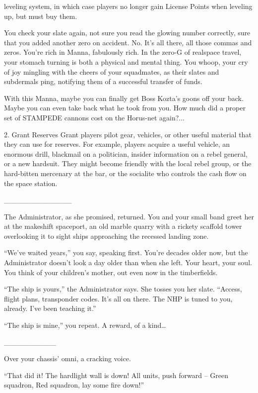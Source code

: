 leveling system, in which case players no longer gain License Points when leveling up, but must
buy them.


You check your slate again, not sure you read the glowing number correctly, sure that you added
another zero on accident. No. It’s all there, all those commas and zeros. You’re rich in Manna,
fabulously rich. In the zero-G of realspace travel, your stomach turning is both a physical and
mental thing. You whoop, your cry of joy mingling with the cheers of your squadmates, as their
slates and subdermals ping, notifying them of a successful transfer of funds.

With this Manna, maybe you can finally get Boss Kozta’s goons off your back. Maybe you can
even take back what he took from you. How much did a proper set of STAMPEDE cannons cost
on the Horus-net again?...

2. Grant Reserves
Grant players pilot gear, vehicles, or other useful material that they can use for reserves. For
example, players acquire a useful vehicle, an enormous drill, blackmail on a politician, insider
information on a rebel general, or a new hardsuit. They might become friendly with the local rebel
group, or the hard-bitten mercenary at the bar, or the socialite who controls the cash flow on the
space station.


\_\_\_\_\_\_\_\_\_\_\_\_\_


The Administrator, as she promised, returned. You and your small band greet her at the makeshift
spaceport, an old marble quarry with a rickety scaffold tower overlooking it to sight ships
approaching the recessed landing zone.

``We’ve waited years,'' you say, speaking first. You’re decades older now, but the Administrator
doesn’t look a day older than when she left. Your heart, your soul. You think of your children’s
mother, out even now in the timberfields.

``The ship is yours,'' the Administrator says. She tosses you her slate. ``Access, flight plans,
transponder codes. It’s all on there. The NHP is tuned to you, already. I’ve been teaching it.''

``The ship is mine,'' you repeat. A reward, of a kind…

\_\_\_\_\_\_\_\_\_\_


Over your chassis’ omni, a cracking voice.

``That did it! The hardlight wall is down! All units, push forward -- Green squadron, Red squadron,
lay some fire down!''




